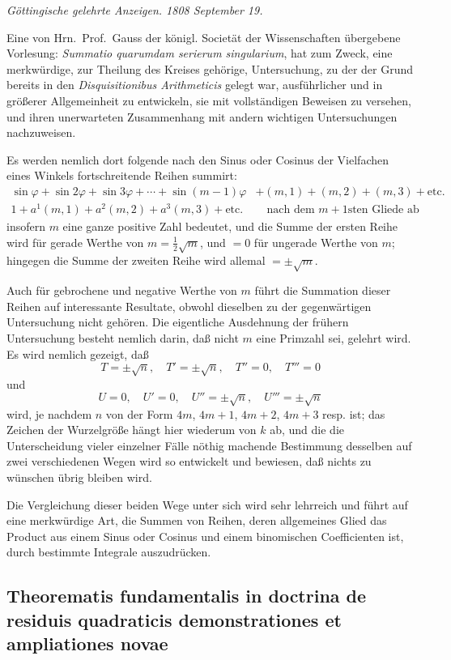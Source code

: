 \documentclass[12pt,a4paper]{article}
\theoremstyle{plain}
\theoremstyle{definition}
\theoremstyle{remark}
\begin{document}
\textit{Göttingische gelehrte Anzeigen. 1808 September 19.}

Eine von Hrn.~Prof.~Gauss der königl. Societät der Wissenschaften übergebene Vorlesung: \textit{Summatio quarumdam serierum singularium}, hat zum Zweck, eine merkwürdige, zur Theilung des Kreises gehörige, Untersuchung, zu der der Grund bereits in den \textit{Disquisitionibus Arithmeticis} gelegt war, ausführlicher und in größerer Allgemeinheit zu entwickeln, sie mit vollständigen Beweisen zu versehen, und ihren unerwarteten Zusammenhang mit andern wichtigen Untersuchungen nachzuweisen.

Es werden nemlich dort folgende nach den Sinus oder Cosinus der Vielfachen eines Winkels fortschreitende Reihen summirt:
\begin{align*}
\sin\varphi + \sin2\varphi + \sin3\varphi + \cdots + \sin(m-1)\varphi &+ (m,1) + (m,2) + (m,3) + \text{etc.} \\
1 + a^1(m,1) + a^2(m,2) + a^3(m,3) + \text{etc.} &\quad \text{nach dem $m+1$sten Gliede ab}
\end{align*}
insofern $m$ eine ganze positive Zahl bedeutet, und die Summe der ersten Reihe wird für gerade Werthe von $m = \frac{1}{2}\sqrt{m}$, und $= 0$ für ungerade Werthe von $m$; hingegen die Summe der zweiten Reihe wird allemal $= \pm\sqrt{m}$.

Auch für gebrochene und negative Werthe von $m$ führt die Summation dieser Reihen auf interessante Resultate, obwohl dieselben zu der gegenwärtigen Untersuchung nicht gehören. Die eigentliche Ausdehnung der frühern Untersuchung besteht nemlich darin, daß nicht $m$ eine Primzahl sei, gelehrt wird. Es wird nemlich gezeigt, daß
\[
T = \pm\sqrt{n},\quad T' = \pm\sqrt{n},\quad T'' = 0,\quad T''' = 0
\]
und
\[
U = 0,\quad U' = 0,\quad U'' = \pm\sqrt{n},\quad U''' = \pm\sqrt{n}
\]
wird, je nachdem $n$ von der Form $4m$, $4m+1$, $4m+2$, $4m+3$ resp. ist; das Zeichen der Wurzelgröße hängt hier wiederum von $k$ ab, und die die Unterscheidung vieler einzelner Fälle nöthig machende Bestimmung desselben auf zwei verschiedenen Wegen wird so entwickelt und bewiesen, daß nichts zu wünschen übrig bleiben wird.

Die Vergleichung dieser beiden Wege unter sich wird sehr lehrreich und führt auf eine merkwürdige Art, die Summen von Reihen, deren allgemeines Glied das Product aus einem Sinus oder Cosinus und einem binomischen Coefficienten ist, durch bestimmte Integrale auszudrücken.

\subsection*{Theorematis fundamentalis in doctrina de residuis quadraticis demonstrationes et ampliationes novae}
\end{document}
